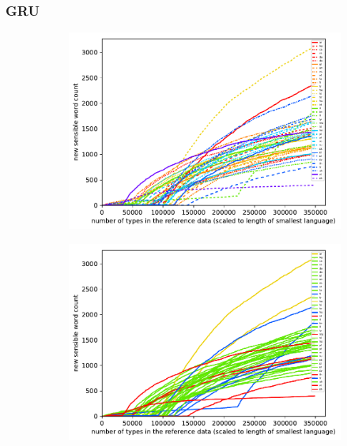 \documentclass[11pt,a4paper,twoside,openright]{scrbook}
\begin{document}
\subsubsection{GRU}


\begin{figure}[h]
    \centering
    \begin{subfigure}[b]{0.32\textwidth}
    	\centering
        \includegraphics[width=\textwidth]{graphs/gru/norm_huge_type_type_performance}
    \end{subfigure}
    \begin{subfigure}[b]{0.32\textwidth}
    	\centering
        \includegraphics[width=\textwidth]{graphs/gru/morph_types/norm_huge_type_type_performance}
    \end{subfigure}
    \begin{subfigure}[b]{0.32\textwidth}

\end{subfigure}
\end{figure}
\end{document}
